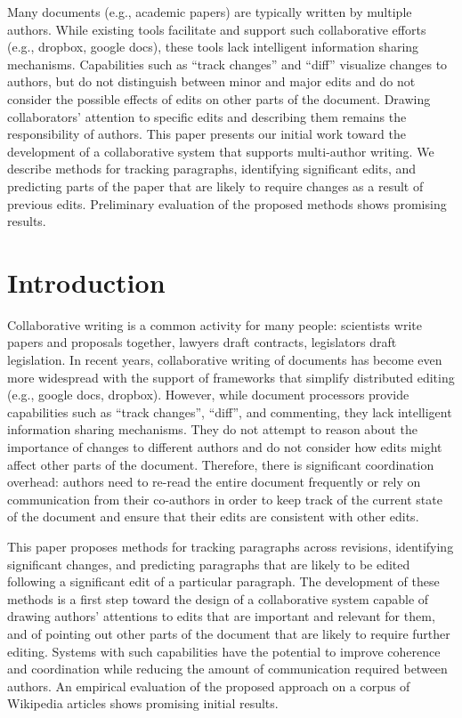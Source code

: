 Many documents (e.g., academic papers) are typically written by multiple
authors. While existing tools facilitate and support such collaborative
efforts (e.g., dropbox, google docs), these tools lack intelligent
information sharing mechanisms. Capabilities such as ``track changes''
and ``diff'' visualize changes to authors, but do not distinguish
between minor and major edits and do not consider the possible effects
of edits on other parts of the document. Drawing collaborators'
attention to specific edits and describing them remains the
responsibility of authors. This paper presents our initial work toward
the development of a collaborative system that supports multi-author
writing. We describe methods for tracking paragraphs, identifying
significant edits, and predicting parts of the paper that are likely to
require changes as a result of previous edits. Preliminary evaluation of
the proposed methods shows promising results.

\section{Introduction}\label{introduction}

Collaborative writing is a common activity for many people: scientists
write papers and proposals together, lawyers draft contracts,
legislators draft legislation. In recent years, collaborative writing of
documents has become even more widespread with the support of frameworks
that simplify distributed editing (e.g., google docs, dropbox). However,
while document processors provide capabilities such as ``track
changes'', ``diff'', and commenting, they lack intelligent information
sharing mechanisms. They do not attempt to reason about the importance
of changes to different authors and do not consider how edits might
affect other parts of the document. Therefore, there is significant
coordination overhead: authors need to re-read the entire document
frequently or rely on communication from their co-authors in order to
keep track of the current state of the document and ensure that their
edits are consistent with other edits.

This paper proposes methods for tracking paragraphs across revisions,
identifying significant changes, and predicting paragraphs that are
likely to be edited following a significant edit of a particular
paragraph. The development of these methods is a first step toward the
design of a collaborative system capable of drawing authors' attentions
to edits that are important and relevant for them, and of pointing out
other parts of the document that are likely to require further editing.
Systems with such capabilities have the potential to improve coherence
and coordination while reducing the amount of communication required
between authors. An empirical evaluation of the proposed approach on a
corpus of Wikipedia articles shows promising initial results.

